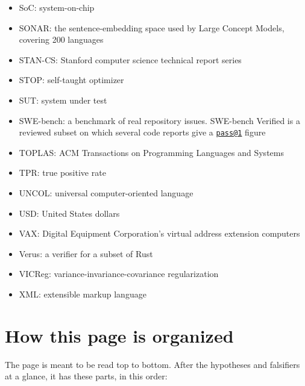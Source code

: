 \documentclass[10pt,letterpaper]{article}
\begin{document}
\begin{itemize}
\item
  SoC: system-on-chip
\item
  SONAR: the sentence-embedding space used by Large Concept Models,
  covering 200 languages
\item
  STAN-CS: Stanford computer science technical report series
\item
  STOP: self-taught optimizer
\item
  SUT: system under test
\item
  SWE-bench: a benchmark of real repository issues. SWE-bench Verified
  is a reviewed subset on which several code reports give a
  \href{mailto:pass@1}{\nolinkurl{pass@1}} figure
\item
  TOPLAS: ACM Transactions on Programming Languages and Systems
\item
  TPR: true positive rate
\item
  UNCOL: universal computer-oriented language
\item
  USD: United States dollars
\item
  VAX: Digital Equipment Corporation's virtual address extension
  computers
\item
  Verus: a verifier for a subset of Rust
\item
  VICReg: variance-invariance-covariance regularization
\item
  XML: extensible markup language
\end{itemize}

\section{How this page is organized}\label{how-this-page-is-organized}

The page is meant to be read top to bottom. After the hypotheses and
falsifiers at a glance, it has these parts, in this order:
\end{document}
